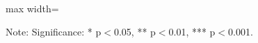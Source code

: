 \documentclass[11pt,harvard]{article}
\begin{document}
	\begin{table}[htbp]
		\centering
		\begin{adjustbox}{max width=\textwidth}
			\begin{threeparttable}
				\caption{CAR: LCS for Essential Needs vs. Food Security}
				\scriptsize
				 
				\label{tab:LCS_F2F_EN_FS_CAR}
				\begin{tablenotes}
					\item Note: Significance: * p$<$0.05, ** p$<$0.01, *** p$<$0.001. 
				\end{tablenotes}
			\end{threeparttable}
		\end{adjustbox}
	\end{table}
	
	
\end{document}
